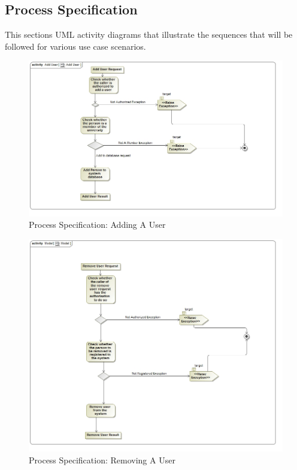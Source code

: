 \documentclass[a4paper]{article}
\begin{document}
	\subsection{Process Specification}
	This sections UML activity diagrams that illustrate the sequences that will be followed for various use case scenarios.
	\begin{figure}[H]
	    \centering
	    \includegraphics[width=\textwidth]{AddUser.jpg}
	    \caption{Process Specification: Adding A User}
	\end{figure}
	\begin{figure}[H]
	    \centering
	    \includegraphics[width=\textwidth]{removeUser.jpg}
	    \caption{Process Specification: Removing A User}
	\end{figure}
\end{document}
